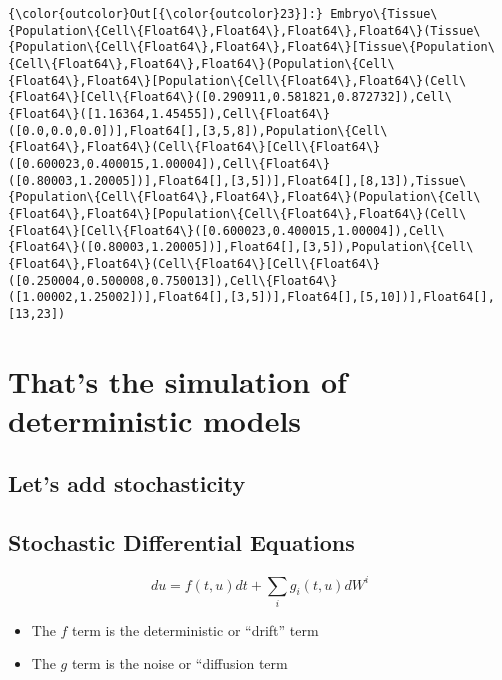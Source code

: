 \documentclass[11pt]{article}
\begin{document}
            \begin{Verbatim}[commandchars=\\\{\}]
{\color{outcolor}Out[{\color{outcolor}23}]:} Embryo\{Tissue\{Population\{Cell\{Float64\},Float64\},Float64\},Float64\}(Tissue\{Population\{Cell\{Float64\},Float64\},Float64\}[Tissue\{Population\{Cell\{Float64\},Float64\},Float64\}(Population\{Cell\{Float64\},Float64\}[Population\{Cell\{Float64\},Float64\}(Cell\{Float64\}[Cell\{Float64\}([0.290911,0.581821,0.872732]),Cell\{Float64\}([1.16364,1.45455]),Cell\{Float64\}([0.0,0.0,0.0])],Float64[],[3,5,8]),Population\{Cell\{Float64\},Float64\}(Cell\{Float64\}[Cell\{Float64\}([0.600023,0.400015,1.00004]),Cell\{Float64\}([0.80003,1.20005])],Float64[],[3,5])],Float64[],[8,13]),Tissue\{Population\{Cell\{Float64\},Float64\},Float64\}(Population\{Cell\{Float64\},Float64\}[Population\{Cell\{Float64\},Float64\}(Cell\{Float64\}[Cell\{Float64\}([0.600023,0.400015,1.00004]),Cell\{Float64\}([0.80003,1.20005])],Float64[],[3,5]),Population\{Cell\{Float64\},Float64\}(Cell\{Float64\}[Cell\{Float64\}([0.250004,0.500008,0.750013]),Cell\{Float64\}([1.00002,1.25002])],Float64[],[3,5])],Float64[],[5,10])],Float64[],[13,23])
\end{Verbatim}
        
    \section{That's the simulation of deterministic
models}\label{thats-the-simulation-of-deterministic-models}

\subsection{Let's add stochasticity}\label{lets-add-stochasticity}

    \subsection{Stochastic Differential
Equations}\label{stochastic-differential-equations}

\[ du = f(t,u)dt + \sum_i g_i(t,u)dW^i \]

\begin{itemize}
\itemsep1pt\parskip0pt
\item
  The $f$ term is the deterministic or ``drift'' term
\item
  The $g$ term is the noise or ``diffusion term
\end{itemize}
\end{document}
